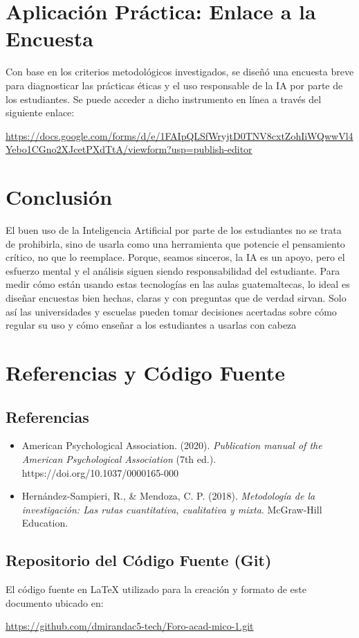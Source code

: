 \documentclass[12pt, letterpaper]{article}
\begin{document}
\section*{Aplicación Práctica: Enlace a la Encuesta}
Con base en los criterios metodológicos investigados, se diseñó una encuesta breve para diagnosticar las prácticas éticas y el uso responsable de la IA por parte de los estudiantes. Se puede acceder a dicho instrumento en línea a través del siguiente enlace:

\begin{center}
    \url{https://docs.google.com/forms/d/e/1FAIpQLSfWryjtD0TNV8cxtZohIiWQwwVl4Yebo1CGno2XJcetPXdTtA/viewform?usp=publish-editor}
\end{center}

\section*{Conclusión}
El buen uso de la Inteligencia Artificial por parte de los estudiantes no se trata de prohibirla, sino de usarla como una herramienta que potencie el pensamiento crítico, no que lo reemplace. Porque, seamos sinceros, la IA es un apoyo, pero el esfuerzo mental y el análisis siguen siendo responsabilidad del estudiante. Para medir cómo están usando estas tecnologías en las aulas guatemaltecas, lo ideal es diseñar encuestas bien hechas, claras y con preguntas que de verdad sirvan. Solo así las universidades y escuelas pueden tomar decisiones acertadas sobre cómo regular su uso y cómo enseñar a los estudiantes a usarlas con cabeza

\newpage

\section*{Referencias y Código Fuente}

\subsection*{Referencias}
\begin{itemize}
    \item American Psychological Association. (2020). \textit{Publication manual of the American Psychological Association} (7th ed.). https://doi.org/10.1037/0000165-000
    \item Hernández-Sampieri, R., \& Mendoza, C. P. (2018). \textit{Metodología de la investigación: Las rutas cuantitativa, cualitativa y mixta}. McGraw-Hill Education.
\end{itemize}

\subsection*{Repositorio del Código Fuente (Git)}
El código fuente en LaTeX utilizado para la creación y formato de este documento ubicado en:

\begin{center}
    \url{https://github.com/dmirandac5-tech/Foro-acad-mico-1.git}
\end{center}
\end{document}
